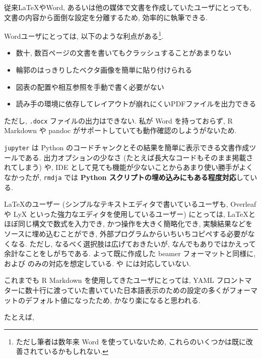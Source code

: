 \documentclass[
  xelatex,ja=standard,jafont=noto]{bxjsbook}
\providecommand{\tightlist}{%
  \setlength{\itemsep}{0pt}\setlength{\parskip}{0pt}}
\theoremstyle{definition}
\theoremstyle{definition}
\theoremstyle{definition}
\theoremstyle{definition}
\theoremstyle{remark}
\begin{document}
従来LaTeXやWord, あるいは他の媒体で文書を作成していたユーザにとっても,
文書の内容から面倒な設定を分離するため, 効率的に執筆できる.

Wordユーザにとっては, 以下のような利点がある\footnote{ただし筆者は数年来
  Word を使っていないため,
  これらのいくつかは既に改善されているかもしれない.}.

\begin{itemize}
\tightlist
\item
  数十, 数百ページの文書を書いてもクラッシュすることがあまりない
\item
  輪郭のはっきりしたベクタ画像を簡単に貼り付けられる
\item
  図表の配置や相互参照を手動で書く必要がない
\item
  読み手の環境に依存してレイアウトが崩れにくいPDFファイルを出力できる
\end{itemize}

ただし, \texttt{.docx} ファイルの出力はできない. 私が Word
を持っておらず, R Markdown や pandoc
がサポートしていても動作確認のしようがないため.

\texttt{jupyter} は Python
のコードチャンクとその結果を簡単に表示できる文書作成ツールである.
出力オプションの少なさ (たとえば長大なコードもそのまま掲載されてしまう)
や, IDE として見ても機能が少ないことからあまり使い勝手がよくなかったが,
\texttt{rmdja} では \textbf{Python
スクリプトの埋め込みにもある程度対応}している.

\LaTeX のユーザー (シンプルなテキストエディタで書いているユーザも,
Overleaf や LyX といった強力なエディタを使用しているユーザー)
にとっては, \LaTeX とほぼ同じ構文で数式を入力でき,
かつ操作を大きく簡略化でき, 実験結果などをソースに埋め込むことができ,
外部プログラムからいちいちコピペする必要がなくなる. ただし,
なるべく選択肢は広げておきたいが,
なんでもありではかえって余計なことをしがちである. よって既に作成した
beamer フォーマットと同様に, \XeLaTeX および
\LuaLaTeX のみの対応を想定している. \pLaTeX や
\upLaTeX には対応していない.

これまでも R Markdown を使用してきたユーザにとっては, YAML
フロントマターに数十行に渡っていた書いていた日本語表示のための設定の多くがフォーマットのデフォルト値になったため,
かなり楽になると思われる.

たとえば,
\end{document}
